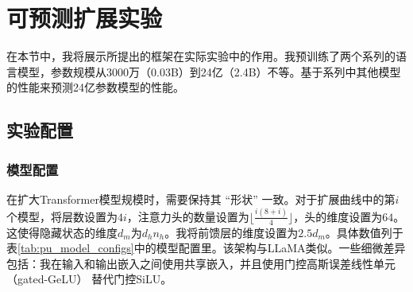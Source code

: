 \section{可预测扩展实验}

在本节中，我将展示所提出的框架在实际实验中的作用。我预训练了两个系列的语言模型，参数规模从3000万（0.03B）到24亿（2.4B）不等。基于系列中其他模型的性能来预测24亿参数模型的性能。

\subsection{实验配置}
\label{sec:train}
\subsubsection{模型配置}
在扩大Transformer模型规模时，需要保持其 “形状” 一致。对于扩展曲线中的第\(i\)个模型，将层数设置为\(4i\)，注意力头的数量设置为\(\lfloor \frac{i(8 + i)}{4} \rfloor\)，头的维度设置为\(64\)。这使得隐藏状态的维度\(d_m\)为\(d_hn_h\)。我将前馈层的维度设置为\(2.5d_m\)。具体数值列于表\ref{tab:pu_model_configs}中的模型配置里。该架构与LLaMA类似\citep{touvron2023llama}。一些细微差异包括：我在输入和输出嵌入之间使用共享嵌入，并且使用门控高斯误差线性单元（gated-GeLU）\citep{hendrycks2016gaussian} 替代门控SiLU\citep{DBLP:journals/corr/abs-2002-05202}。

\begin{table}[htbp]
    \centering
    \caption{扩展曲线中各模型的模型配置和训练配置。N（十亿）表示模型的非嵌入参数数量，单位为十亿。BS（百万）表示用于训练模型的每个批次中的令牌数（即批量大小），单位为百万。TS表示训练步数。令牌数（十亿）指用于训练模型的令牌总数。}
    \label{tab:pu_model_configs}
\end{table}



